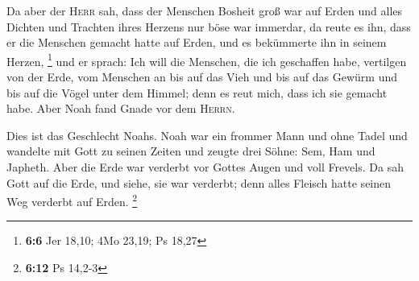  Da aber der \textsc{Herr} sah, dass der Menschen Bosheit
groß war auf Erden und alles Dichten und Trachten ihres Herzens nur böse
war immerdar,  da reute es ihn, dass er die Menschen
gemacht hatte auf Erden, und es bekümmerte ihn in seinem Herzen,
\footnote{\textbf{6:6} Jer 18,10; 4Mo 23,19; Ps 18,27} 
und er sprach: Ich will die Menschen, die ich geschaffen habe, vertilgen
von der Erde, vom Menschen an bis auf das Vieh und bis auf das Gewürm
und bis auf die Vögel unter dem Himmel; denn es reut mich, dass ich sie
gemacht habe.  Aber Noah fand Gnade vor dem
\textsc{Herrn}.

 Dies ist das Geschlecht Noahs. Noah war ein frommer Mann
und ohne Tadel und wandelte mit Gott zu seinen Zeiten 
und zeugte drei Söhne: Sem, Ham und Japheth.  Aber die
Erde war verderbt vor Gottes Augen und voll Frevels.  Da
sah Gott auf die Erde, und siehe, sie war verderbt; denn alles Fleisch
hatte seinen Weg verderbt auf Erden. \footnote{\textbf{6:12} Ps 14,2-3}

